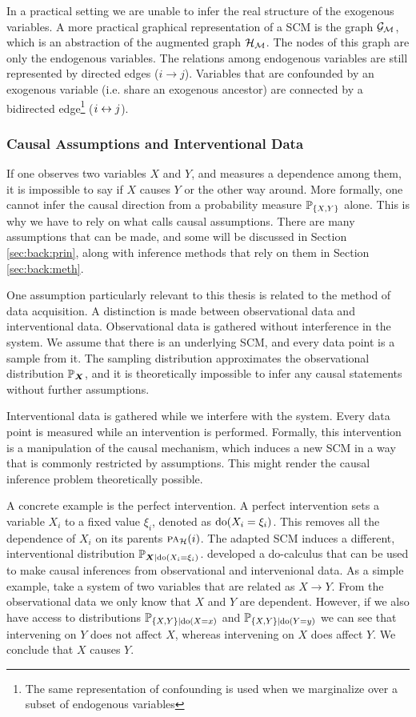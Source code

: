 In a practical setting we are unable to infer the real structure of the exogenous variables. A more practical graphical representation of a SCM is the graph $\mathcal{G}_{\mathcal{M}}$, which is an abstraction of the augmented graph $\mathcal{H}_{\mathcal{M}}$. The nodes of this graph are only the endogenous variables. The relations among endogenous variables are still represented by directed edges ($i \to j$). Variables that are confounded by an exogenous variable (i.e. share an exogenous ancestor) are connected by a bidirected edge\footnote{The same representation of confounding is used when we marginalize over a subset of endogenous variables} ($i\leftrightarrow j$).

\subsubsection{Causal Assumptions and Interventional Data}
If one observes two variables $X$ and $Y$, and measures a dependence among them, it is impossible to say if $X$ causes $Y$ or the other way around. More formally, one cannot infer the causal direction from a probability measure $\mathbb{P}_{\{X,Y\}}$ alone. This is why we have to rely on what \citet{pearl2009causality} calls causal assumptions. There are many assumptions that can be made, and some will be discussed in Section \ref{sec:back:prin}, along with inference methods that rely on them in Section \ref{sec:back:meth}. 

One assumption particularly relevant to this thesis is related to the method of data acquisition. A distinction is made between observational data and interventional data. Observational data is gathered without interference in the system. We assume that there is an underlying SCM, and every data point is a sample from it. The sampling distribution approximates the observational distribution $\mathbb{P}_{\bm{X}}$, and it is theoretically impossible to infer any causal statements without further assumptions. 

Interventional data is gathered while we interfere with the system. Every data point is measured while an intervention is performed. Formally, this intervention is a manipulation of the causal mechanism, which induces a new SCM in a way that is commonly restricted by assumptions. This might render the causal inference problem theoretically possible. 

A concrete example is the perfect intervention. A perfect intervention sets a variable $X_i$ to a fixed value $\xi_i$, denoted as $\mathrm{do}(X_i=\xi_i)$. This removes all the dependence of $X_i$ on its parents $\text{\normalfont\scshape pa}_{\mathcal{H}}(i)$. The adapted SCM induces a different, interventional distribution $\mathbb{P}_{\bm{X}|\mathrm{do}(X_i=\xi_i)}$. \citet{pearl2009causality} developed a do-calculus that can be used to make causal inferences from observational and intervenional data. As a simple example, take a system of two variables that are related as $X\to Y$. From the observational data we only know that $X$ and $Y$ are dependent. However, if we also have access to distributions $\mathbb{P}_{\{X,Y\}|\mathrm{do}(X=x)}$ and $\mathbb{P}_{\{X,Y\}|\mathrm{do}(Y=y)}$ we can see that intervening on $Y$ does not affect $X$, whereas intervening on $X$ does affect $Y$. We conclude that $X$ causes $Y$. 


